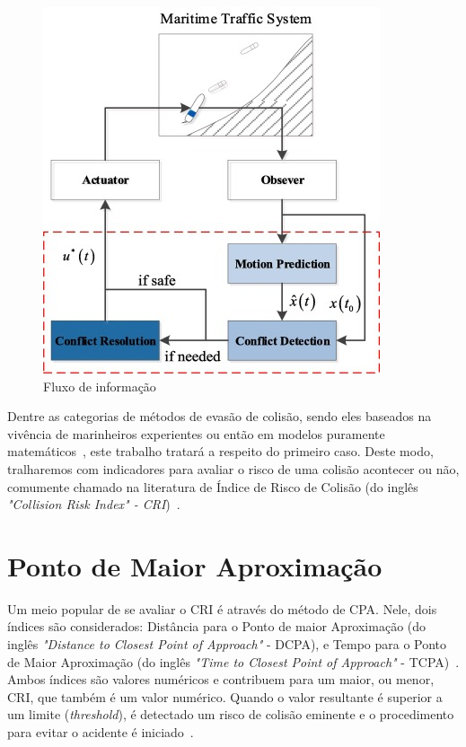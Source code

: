         \begin{figure}
            \centering
            \includegraphics{fig/chap2/information_flow.png}
            \caption{Fluxo de informação ~\cite{HUANG2020451}}
            \label{fig:Huang2020_collisionAvoidanceProcess}
        \end{figure}
        
        Dentre as categorias de métodos de evasão de colisão, sendo eles baseados na vivência de marinheiros experientes ou então em modelos puramente matemáticos~\cite{HUANG2020451}, este trabalho tratará a respeito do primeiro caso. Deste modo, tralharemos com indicadores para avaliar o risco de uma colisão acontecer ou não, comumente chamado na literatura de Índice de Risco de Colisão (do inglês \textit{"Collision Risk Index" - CRI})~\cite{HUANG2019142}.
        
    \section{Ponto de Maior Aproximação}\label{subchap2:cpa}
        Um meio popular de se avaliar o CRI é através do método de CPA. Nele, dois índices são considerados: Distância para o Ponto de maior Aproximação (do inglês \textit{"Distance to Closest Point of Approach"} - DCPA), e Tempo para o Ponto de Maior Aproximação (do inglês \textit{"Time to Closest Point of Approach"} - TCPA)~\cite{HUANG2019142}. Ambos índices são valores numéricos e contribuem para um maior, ou menor, CRI, que também é um valor numérico. Quando o valor resultante é superior a um limite (\textit{threshold}), é detectado um risco de colisão eminente e o procedimento para evitar o acidente é iniciado~\cite{HUANG2020451}. 
        
